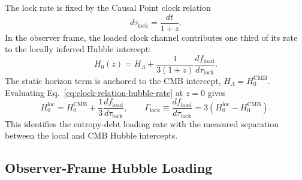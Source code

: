\documentclass[11pt,letterpaper]{article}
\theoremstyle{plain}
\newcommand{\hcmb}{H_0^{\text{CMB}}}
\newcommand{\hloc}{H_0^{\text{loc}}}
\newcommand{\fload}{f_{\text{load}}}
\newcommand{\GammaLock}{\Gamma_{\text{lock}}}
\begin{document}
The lock rate is fixed by the Causal Point clock relation
\begin{equation}
\label{eq:causal-point-clock-relation-section-nine}
 d\tau_{\text{lock}}
 =
 \frac{dt}{1+z}.
\end{equation}
In the observer frame, the loaded clock channel contributes one third of its
rate to the locally inferred Hubble intercept:
\begin{equation}
\label{eq:clock-relation-hubble-rate}
 H_0(z)
 =
 H_{\Lambda}
 +
 \frac{1}{3(1+z)}
 \frac{d\fload}{d\tau_{\text{lock}}}.
\end{equation}
The static horizon term is anchored to the CMB intercept,
\(H_{\Lambda}=\hcmb\).  Evaluating Eq.~\eqref{eq:clock-relation-hubble-rate}
at \(z=0\) gives
\begin{equation}
\label{eq:gamma-lock-from-hubble-difference}
 \hloc
 =
 \hcmb+\frac{1}{3}\frac{d\fload}{d\tau_{\text{lock}}},
 \qquad
 \GammaLock
 \equiv
 \frac{d\fload}{d\tau_{\text{lock}}}
 =
 3(\hloc-\hcmb).
\end{equation}
This identifies the entropy-debt loading rate with the measured separation
between the local and CMB Hubble intercepts.

\subsection{Observer-Frame Hubble Loading}
\end{document}
